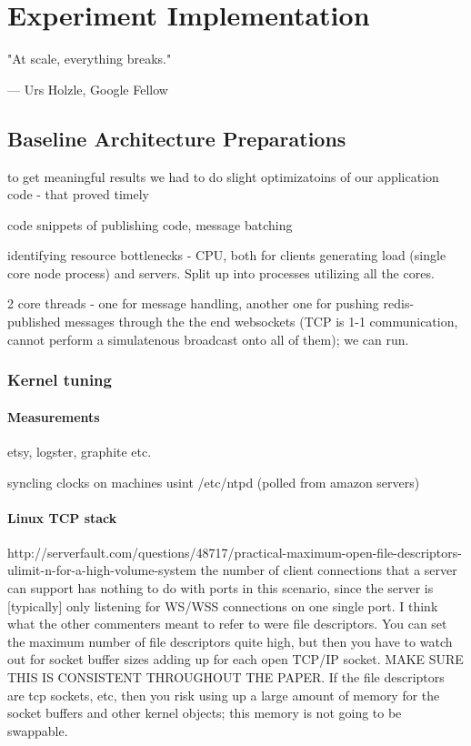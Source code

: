 \documentclass{uvamscse}
\begin{document}

\chapter{Experiment Implementation} \label{Experiment Implementation}

\epigraph{"At scale, everything breaks."}{--- Urs Holzle, Google Fellow}

\section{Baseline Architecture Preparations}\label{Baseline Architecture Preparations}
to get meaningful results we had to do slight optimizatoins of our application code - that proved timely

code snippets of publishing code, message batching

identifying resource bottlenecks - CPU, both for clients generating load (single core node process) and servers. Split up into processes utilizing all the cores.

2 core threads - one for message handling, another one for pushing redis-published messages through the the end websockets (TCP is 1-1 communication, cannot perform a simulatenous broadcast onto all of them); we can run.

\subsection{Kernel tuning}\label{Kernel tuning}

\subsubsection{Measurements}
etsy, logster, graphite etc.

syncling clocks on machines usint /etc/ntpd (polled from amazon servers)

\subsubsection{Linux TCP stack}

http://serverfault.com/questions/48717/practical-maximum-open-file-descriptors-ulimit-n-for-a-high-volume-system
the number of client connections that a server can support has nothing to do with ports in this scenario, since the server is [typically] only listening for WS/WSS connections on one single port. I think what the other commenters meant to refer to were file descriptors. You can set the maximum number of file descriptors quite high, but then you have to watch out for socket buffer sizes adding up for each open TCP/IP socket.  MAKE SURE THIS IS CONSISTENT THROUGHOUT THE PAPER.
If the file descriptors are tcp sockets, etc, then you risk using up a large amount of memory for the socket buffers and other kernel objects; this memory is not going to be swappable.
\end{document}
